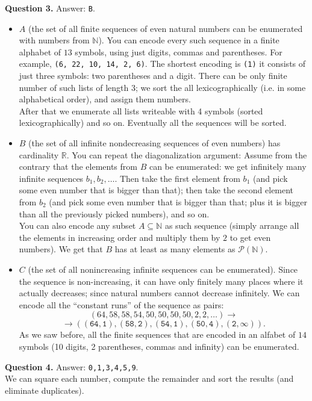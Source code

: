 \documentclass[jou]{apa6}
\begin{document}
\vspace{6pt}
{\bf Question 3.} Answer: {\tt B}.
\begin{itemize} 
\item $A$ (the set of all finite sequences of even natural numbers can be enumerated
with numbers from $\mathbb{N}$). You can encode 
every such sequence in a finite alphabet of $13$ symbols, 
using just digits, commas and parentheses. For example, {\tt (6, 22, 10, 14, 2, 6)}. 
The shortest encoding is {\tt (1)} \textendash it consists of just three symbols: 
two parentheses and a digit. There can be only finite number of such lists of 
length $3$; we sort the all lexicographically (i.e. in some alphabetical order), and
assign them numbers.\\
After that we enumerate all lists writeable with 4 symbols (sorted lexicographically) 
and so on. Eventually all the sequences will be sorted.
\item $B$ (the set of all infinite nondecreasing sequences of even numbers) 
has cardinality $\mathbb{R}$. You can repeat the diagonalization argument: 
Assume from the contrary that the elements from $B$ can be enumerated: we get
infinitely many infinite sequences $b_1,b_2,\ldots$.  
Then take the first element from $b_1$ (and pick some even number that is bigger than that); 
then take the second element from $b_2$ (and pick some even number that is bigger than 
that; plus it is bigger than all the previously picked numbers), and so on.\\
You can also encode any subset $A \subseteq \mathbb{N}$ as such sequence (simply arrange all 
the elements in increasing order and multiply them by $2$ to get even numbers). 
We get that $B$ has at least as many elements as $\mathcal{P}(\mathbb{N})$. 
\item $C$ (the set of all nonincreasing infinite sequences can be 
enumerated). Since the sequence is non-increasing, it can have only finitely many 
places where it actually decreases; since natural numbers cannot decrease infinitely. 
We can encode all the ``constant runs'' of the sequence as pairs:\\
$$(64,58,58,54,50,50,50,50,2,2,\ldots) \rightarrow $$
$$\rightarrow \mathtt{((64,1),(58,2),(54,1),(50,4),(2,\infty))}.$$
As we saw before, all the finite sequences that are encoded in an alfabet
of $14$ symbols (10 digits, 2 parentheses, commas and infinity) can be enumerated.
\end{itemize}


\vspace{6pt}
{\bf Question 4.} Answer: {\tt 0,1,3,4,5,9}.\\
We can square each number, compute the remainder and sort the 
results (and eliminate duplicates).
\end{document}
